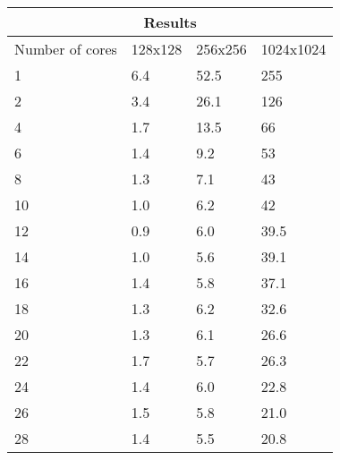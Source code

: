 \documentclass{article}
\begin{document}
\begin{multicols}{2}
\begin{center}
  \begin{tabular}{ |p{1.5cm}||p{1.5cm}|p{1.5cm}|p{1.5cm}| }
 \hline
 \multicolumn{4}{|c|}{Results} \\
 \hline
 Number of cores & 128x128 & 256x256 & 1024x1024 \\
 \hline
 1  & 6.4 &  52.5  &  255     \\
 2  & 3.4 &  26.1  &  126     \\
 4  & 1.7 &  13.5  &  66      \\ 
 6  & 1.4 &  9.2   &  53      \\ 
 8  & 1.3 &  7.1   &  43      \\ 
 10 & 1.0 &  6.2   &  42      \\
 12 & 0.9 &  6.0   &  39.5    \\
 14 & 1.0 &  5.6   &  39.1    \\ 
 16 & 1.4 &  5.8   &  37.1    \\ 
 18 & 1.3 &  6.2   &  32.6    \\
 20 & 1.3 &  6.1   &  26.6    \\
 22 & 1.7 &  5.7   &  26.3    \\ 
 24 & 1.4 &  6.0   &  22.8    \\ 
 26 & 1.5 &  5.8   &  21.0    \\ 
 28 & 1.4 &  5.5   &  20.8    \\
 \hline
\end{tabular}
\label{tab:parallelresults}
\end{center}


\end{multicols}
\end{document}
